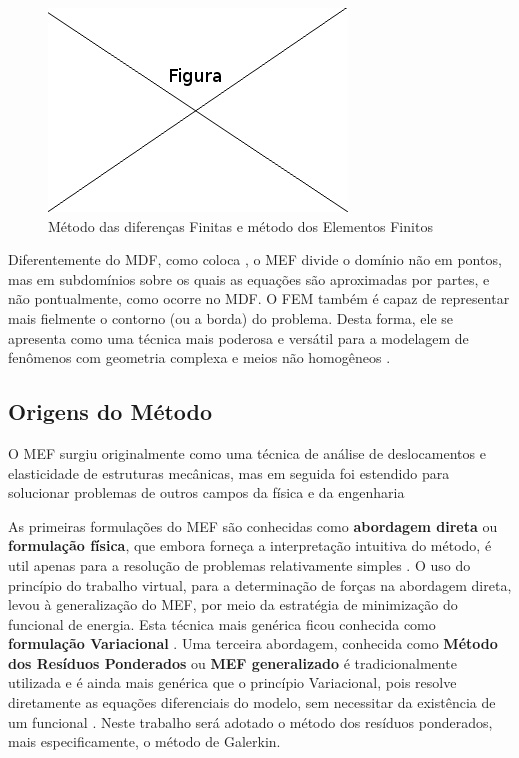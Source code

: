 \documentclass[
    12pt,               %
    openright,          %
    oneside,
    a4paper,            %
    english,            %
    french,             %
    spanish,            %
    brazil              %
    ]{abntex2}
\begin{document}
\begin{figure}[!htb]
\centering
\includegraphics[scale=0.5]{figuras/temp.png}
\caption{Método das diferenças Finitas e método dos Elementos Finitos}
\label{fig:mdfFem}
\end{figure}

Diferentemente do MDF, como coloca \cite[p. 4]{huebner}, o MEF divide o domínio não em pontos, mas em subdomínios sobre os quais as equações são aproximadas por partes, e não pontualmente, como ocorre no MDF. O FEM também é capaz de representar mais fielmente o contorno (ou a borda) do problema. Desta forma, ele se apresenta como uma técnica mais poderosa e versátil para a modelagem de fenômenos com geometria complexa e meios não homogêneos \cite[p. 390]{sadiku}. 


\subsection{Origens do Método}

O MEF surgiu originalmente como uma técnica de análise de deslocamentos e elasticidade de estruturas mecânicas, mas em seguida foi estendido para solucionar problemas de outros campos da física e da engenharia \cite[p. 19]{jin} \cite[p. 3]{desai} \cite[p. 2]{zien}

As primeiras formulações do MEF são conhecidas como \textbf{abordagem direta} ou \textbf{formulação física}, que embora forneça a interpretação intuitiva do método, é util apenas para a resolução de problemas relativamente simples \cite[p. 6]{huebner}. O uso do princípio do trabalho virtual, para a determinação de forças na abordagem direta, levou à generalização do MEF, por meio da estratégia de minimização do funcional de energia. Esta técnica mais genérica  ficou conhecida como \textbf{formulação Variacional} \cite[p. 113]{desai} \cite[p. 20]{zien}. Uma terceira abordagem, conhecida como \textbf{Método dos Resíduos Ponderados} ou \textbf{MEF generalizado} \cite[p. 61]{zien} é tradicionalmente utilizada e é ainda mais genérica que o princípio Variacional, pois resolve diretamente as equações diferenciais do modelo, sem necessitar da existência de um funcional \cite[p. 261]{desai}. Neste trabalho será adotado o método dos resíduos ponderados, mais especificamente, o método de Galerkin.
\end{document}
